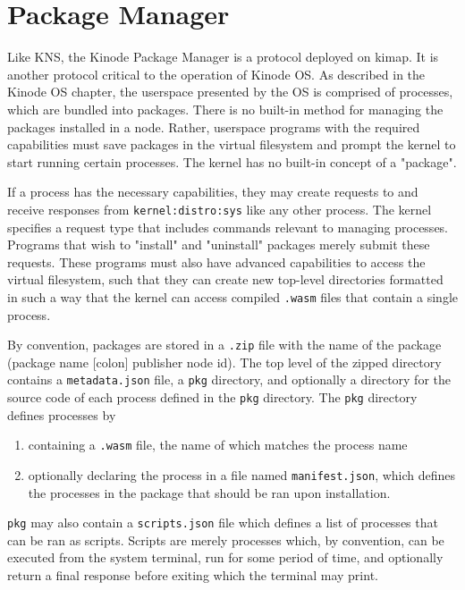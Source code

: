 \documentclass[runningheads]{llncs}
\begin{document}
\section{Package Manager}

Like KNS, the Kinode Package Manager is a protocol deployed on kimap.
It is another protocol critical to the operation of Kinode OS.
As described in the Kinode OS chapter, the userspace presented by the OS is comprised of processes, which are bundled into packages.
There is no built-in method for managing the packages installed in a node.
Rather, userspace programs with the required capabilities must save packages in the virtual filesystem and prompt the kernel to start running certain processes.
The kernel has no built-in concept of a "package".

If a process has the necessary capabilities, they may create requests to and receive responses from \verb|kernel:distro:sys| like any other process.
The kernel specifies a request type that includes commands relevant to managing processes.
Programs that wish to "install" and "uninstall" packages merely submit these requests.
These programs must also have advanced capabilities to access the virtual filesystem, such that they can create new top-level directories formatted in such a way that the kernel can access compiled \verb|.wasm| files that contain a single process.

By convention, packages are stored in a \verb|.zip| file with the name of the package (package name [colon] publisher node id).
The top level of the zipped directory contains a \verb|metadata.json| file, a \verb|pkg| directory, and optionally a directory for the source code of each process defined in the \verb|pkg| directory.
The \verb|pkg| directory defines processes by
\begin{enumerate}
    \item containing a \verb|.wasm| file, the name of which matches the process name
    \item optionally declaring the process in a file named \verb|manifest.json|, which defines the processes in the package that should be ran upon installation.
\end{enumerate}

\verb|pkg| may also contain a \verb|scripts.json| file which defines a list of processes that can be ran as scripts.
Scripts are merely processes which, by convention, can be executed from the system terminal, run for some period of time, and optionally return a final response before exiting which the terminal may print.
\end{document}
